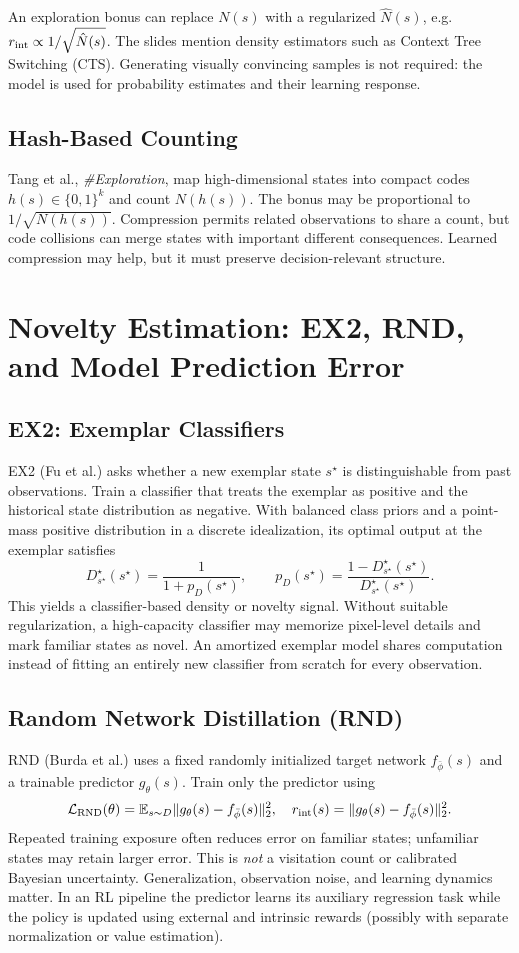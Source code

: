 An exploration bonus can replace $N(s)$ with a regularized $\hat N(s)$, e.g.\ $r_{\rm int}\propto1/\sqrt{\hat N(s)}$. The slides mention density estimators such as Context Tree Switching (CTS). Generating visually convincing samples is not required: the model is used for probability estimates and their learning response.

\subsection{Hash-Based Counting}
Tang et al., \emph{\#Exploration}, map high-dimensional states into compact codes $h(s)\in\{0,1\}^k$ and count $N(h(s))$. The bonus may be proportional to $1/\sqrt{N(h(s))}$. Compression permits related observations to share a count, but code collisions can merge states with important different consequences. Learned compression may help, but it must preserve decision-relevant structure.

\section{Novelty Estimation: EX2, RND, and Model Prediction Error}
\subsection{EX2: Exemplar Classifiers}
EX2 (Fu et al.) asks whether a new exemplar state $s^\star$ is distinguishable from past observations. Train a classifier that treats the exemplar as positive and the historical state distribution as negative. With balanced class priors and a point-mass positive distribution in a discrete idealization, its optimal output at the exemplar satisfies
\[
D^\star_{s^\star}(s^\star)=\frac{1}{1+p_D(s^\star)},
\qquad
p_D(s^\star)=\frac{1-D^\star_{s^\star}(s^\star)}{D^\star_{s^\star}(s^\star)}.
\]
This yields a classifier-based density or novelty signal. Without suitable regularization, a high-capacity classifier may memorize pixel-level details and mark familiar states as novel. An amortized exemplar model shares computation instead of fitting an entirely new classifier from scratch for every observation.

\subsection{Random Network Distillation (RND)}
RND (Burda et al.) uses a fixed randomly initialized target network $f_{\bar\phi}(s)$ and a trainable predictor $g_\theta(s)$. Train only the predictor using
\[
\mathcal L_{\rm RND}(\theta)=
\mathbb E_{s\sim D}\|g_\theta(s)-f_{\bar\phi}(s)\|_2^2,
\quad
r_{\rm int}(s)=\|g_\theta(s)-f_{\bar\phi}(s)\|_2^2.
\]
Repeated training exposure often reduces error on familiar states; unfamiliar states may retain larger error. This is \emph{not} a visitation count or calibrated Bayesian uncertainty. Generalization, observation noise, and learning dynamics matter. In an RL pipeline the predictor learns its auxiliary regression task while the policy is updated using external and intrinsic rewards (possibly with separate normalization or value estimation).

